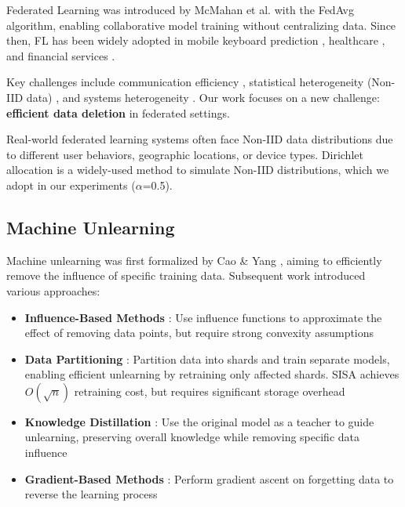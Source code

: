 \documentclass[10pt,twocolumn]{article}
\begin{document}
Federated Learning was introduced by McMahan et al. \cite{mcmahan2017communication} with the FedAvg algorithm, enabling collaborative model training without centralizing data. Since then, FL has been widely adopted in mobile keyboard prediction \cite{hard2018federated}, healthcare \cite{rieke2020future}, and financial services \cite{yang2019federated}.

Key challenges include communication efficiency \cite{konecny2016federated,sattler2019robust}, statistical heterogeneity (Non-IID data) \cite{li2020federated,zhao2018federated}, and systems heterogeneity \cite{bonawitz2019towards}. Our work focuses on a new challenge: \textbf{efficient data deletion} in federated settings.

Real-world federated learning systems often face Non-IID data distributions due to different user behaviors, geographic locations, or device types. Dirichlet allocation \cite{hsu2019measuring} is a widely-used method to simulate Non-IID distributions, which we adopt in our experiments ($\alpha$=0.5).

\subsection{Machine Unlearning}

Machine unlearning was first formalized by Cao \& Yang \cite{cao2015towards}, aiming to efficiently remove the influence of specific training data. Subsequent work introduced various approaches:

\begin{itemize}
\item \textbf{Influence-Based Methods} \cite{koh2017understanding}: Use influence functions to approximate the effect of removing data points, but require strong convexity assumptions
\item \textbf{Data Partitioning} \cite{bourtoule2021machine,baumhauer2022machine}: Partition data into shards and train separate models, enabling efficient unlearning by retraining only affected shards. SISA \cite{bourtoule2021machine} achieves $O(\sqrt{n})$ retraining cost, but requires significant storage overhead
\item \textbf{Knowledge Distillation} \cite{golatkar2020eternal,tarun2021fast}: Use the original model as a teacher to guide unlearning, preserving overall knowledge while removing specific data influence
\item \textbf{Gradient-Based Methods} \cite{guo2020certified,thudi2022necessity}: Perform gradient ascent on forgetting data to reverse the learning process
\end{itemize}
\end{document}

